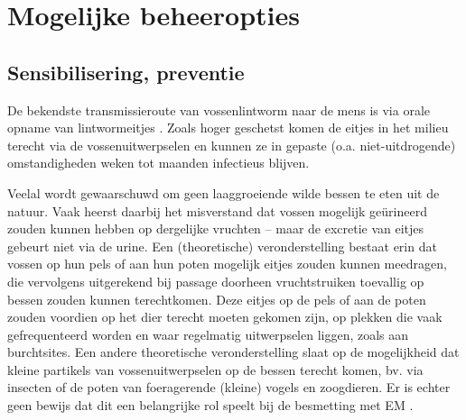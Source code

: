 \documentclass[twoside]{extreport}
\begin{document}
\newpage

\section{Mogelijke beheeropties}\label{mogelijke-beheeropties}

\subsection{Sensibilisering, preventie}\label{sensibilisering-preventie}

De bekendste transmissieroute van vossenlintworm naar de mens is via
orale opname van lintwormeitjes \citep{torgerson2008alveolar}. Zoals
hoger geschetst komen de eitjes in het milieu terecht via de
vossenuitwerpselen en kunnen ze in gepaste (o.a. niet-uitdrogende)
omstandigheden weken tot maanden infectieus blijven.

Veelal wordt gewaarschuwd om geen laaggroeiende wilde bessen te eten uit
de natuur. Vaak heerst daarbij het misverstand dat vossen mogelijk
geürineerd zouden kunnen hebben op dergelijke vruchten -- maar de
excretie van eitjes gebeurt niet via de urine. Een (theoretische)
veronderstelling bestaat erin dat vossen op hun pels of aan hun poten
mogelijk eitjes zouden kunnen meedragen, die vervolgens uitgerekend bij
passage doorheen vruchtstruiken toevallig op bessen zouden kunnen
terechtkomen. Deze eitjes op de pels of aan de poten zouden voordien op
het dier terecht moeten gekomen zijn, op plekken die vaak gefrequenteerd
worden en waar regelmatig uitwerpselen liggen, zoals aan burchtsites.
Een andere theoretische veronderstelling slaat op de mogelijkheid dat
kleine partikels van vossenuitwerpselen op de bessen terecht komen, bv.
via insecten of de poten van foeragerende (kleine) vogels en zoogdieren.
Er is echter geen bewijs dat dit een belangrijke rol speelt bij de
besmetting met EM
\citep{kreidl1998domestic, kern2004risk, piarroux2013populations}.
\end{document}
